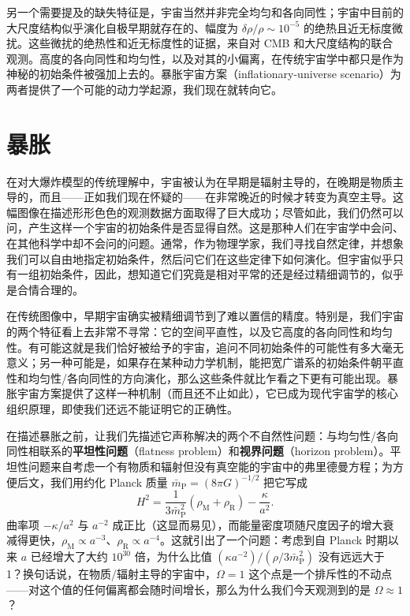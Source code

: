 另一个需要提及的缺失特征是，宇宙当然并非完全均匀和各向同性；宇宙中目前的大尺度结构似乎演化自极早期就存在的、幅度为 $\delta\rho/\rho\sim 10^{-5}$ 的绝热且近无标度微扰。这些微扰的绝热性和近无标度性的证据，来自对 CMB 和大尺度结构的联合观测。高度的各向同性和均匀性，以及对其的小偏离，在传统宇宙学中都只是作为神秘的初始条件被强加上去的。暴胀宇宙方案（inflationary-universe scenario）为两者提供了一个可能的动力学起源，我们现在就转向它。

\section{暴胀}

在对大爆炸模型的传统理解中，宇宙被认为在早期是辐射主导的，在晚期是物质主导的，而且——正如我们现在怀疑的——在非常晚近的时候才转变为真空主导。这幅图像在描述形形色色的观测数据方面取得了巨大成功；尽管如此，我们仍然可以问，产生这样一个宇宙的初始条件是否显得自然。这是那种人们在宇宙学中会问、在其他科学中却不会问的问题。通常，作为物理学家，我们寻找自然定律，并想象我们可以自由地指定初始条件，然后问它们在这些定律下如何演化。但宇宙似乎只有一组初始条件，因此，想知道它们究竟是相对平常的还是经过精细调节的，似乎是合情合理的。

在传统图像中，早期宇宙确实被精细调节到了难以置信的精度。特别是，我们宇宙的两个特征看上去非常不寻常：它的空间平直性，以及它高度的各向同性和均匀性。有可能这就是我们恰好被给予的宇宙，追问不同初始条件的可能性有多大毫无意义；另一种可能是，如果存在某种动力学机制，能把宽广谱系的初始条件朝平直性和均匀性/各向同性的方向演化，那么这些条件就比乍看之下更有可能出现。暴胀宇宙方案提供了这样一种机制（而且还不止如此），它已成为现代宇宙学的核心组织原理，即使我们还远不能证明它的正确性。

在描述暴胀之前，让我们先描述它声称解决的两个不自然性问题：与均匀性/各向同性相联系的\textbf{平坦性问题}（flatness problem）和\textbf{视界问题}（horizon problem）。平坦性问题来自考虑一个有物质和辐射但没有真空能的宇宙中的弗里德曼方程；为方便后文，我们用约化 Planck 质量 $\bar{m}_{\mathrm{P}}=(8\pi G)^{-1/2}$ 把它写成
\begin{equation*}
H^{2} = \frac{1}{3\bar{m}_{\mathrm{P}}^{2}}\left(\rho_{\mathrm{M}}+\rho_{\mathrm{R}}\right) - \frac{\kappa}{a^{2}}.
\tag{8.180}
\end{equation*}
曲率项 $-\kappa/a^{2}$ 与 $a^{-2}$ 成正比（这显而易见），而能量密度项随尺度因子的增大衰减得更快，$\rho_{\mathrm{M}}\propto a^{-3}$、$\rho_{\mathrm{R}}\propto a^{-4}$。这就引出了一个问题：考虑到自 Planck 时期以来 $a$ 已经增大了大约 $10^{30}$ 倍，为什么比值 $(\kappa a^{-2})/(\rho/3\bar{m}_{\mathrm{P}}^{2})$ 没有远远大于 1？换句话说，在物质/辐射主导的宇宙中，$\Omega=1$ 这个点是一个排斥性的不动点——对这个值的任何偏离都会随时间增长，那么为什么我们今天观测到的是 $\Omega\approx 1$？

